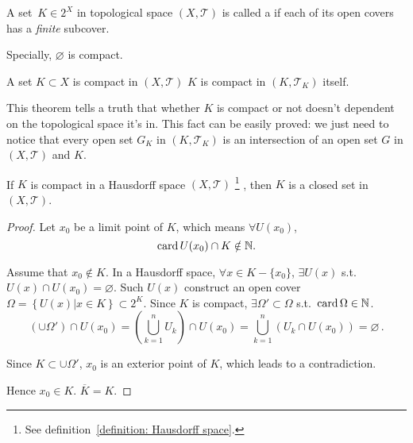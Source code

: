 \documentclass[openany]{book}
\begin{document}
\begin{definition}\label{definition: compact set}
	A set~$K \in 2^X$ in topological space $(X, \mathscr T)$ is called a  if each of its open covers has a \emph{finite} subcover. 
\end{definition}

Specially, $\varnothing$ is compact.

\begin{theorem}\label{theorem: compact iff compact in subspace}
	A set $K \subset X$ is compact in $(X,\mathscr T)$  $K$ is compact in $(K, \mathscr T_K)$ itself. 
\end{theorem}

This theorem tells a truth that whether $K$ is compact or not doesn't dependent on the topological space it's in. 
This fact can be easily proved: we just need to notice that every open set $G_K$ in $(K, \mathscr T_K)$ is an intersection of an open set $G$ in $(X, \mathscr T)$ and $K$. 

\begin{theorem}\label{theorem: compact sets are closed in Hausdorff space}
	If $K$ is compact in a Hausdorff space $(X, \mathscr T)$%
		\footnote{See definition~\ref{definition: Hausdorff space}. }%
	, then $K$ is a closed set in $(X, \mathscr T)$.
\end{theorem}
\begin{proof}
	Let $x_0$ be a limit point of $K$, which means $\forall U(x_0)$, 
	\[
		\operatorname{card} U(x_0)\cap K \notin \mathbb{N}.
	\]

	Assume that $x_0 \notin K$. 
	In a Hausdorff space, $\forall x \in K - \{x_0\}$, $\exists U(x)$ s.t. $U(x)\cap U(x_0)=\varnothing$. 
	Such $U(x)$ construct an open cover $\varOmega=\left\{U(x)|x\in K \right\}\subset 2^K$. 
	Since $K$ is compact, $\exists \varOmega' \subset \varOmega$ s.t.\ $\operatorname{card} \Omega \in \mathbb{N}$. 
	\[
		\left(\cup\Omega'\right)
		\cap U(x_0)
		=
		\left(\bigcup_{k=1}^n{U_k}\right)
		\cap U(x_0)
		=
		\bigcup_{k=1}^n\left(
			U_k\cap U(x_0)
		\right)
		=
		\varnothing\,.
	\]

	Since $K\subset \cup \Omega'$, $x_0$ is an exterior point of $K$, which leads to a contradiction. 

	Hence $x_0 \in K$. $\overline K = K$.
\end{proof}
\end{document}
